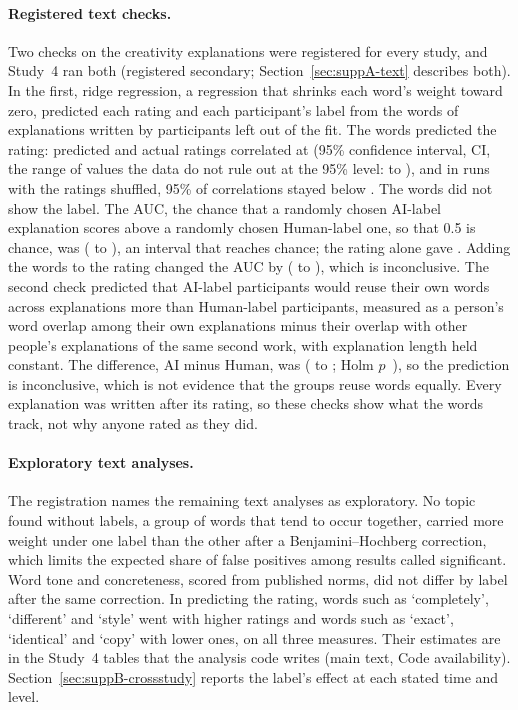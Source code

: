 \paragraph*{Registered text checks.}
Two checks on the creativity explanations were registered for every study, and Study~4 ran both (registered secondary; Section~\ref{sec:suppA-text} describes both). In the first, ridge regression, a regression that shrinks each word's weight toward zero, predicted each rating and each participant's label from the words of explanations written by participants left out of the fit. The words predicted the rating: predicted and actual ratings correlated at \SFourTextRecRatingCreat{} (95\% confidence interval, CI, the range of values the data do not rule out at the 95\% level: \SFourTextRecRatingCreatLo{} to \SFourTextRecRatingCreatHi), and in runs with the ratings shuffled, 95\% of correlations stayed below \SFourTextRecRatingCreatNull. The words did not show the label. The AUC, the chance that a randomly chosen AI-label explanation scores above a randomly chosen Human-label one, so that 0.5 is chance, was \SFourTextRecArmCreat{} (\SFourTextRecArmCreatLo{} to \SFourTextRecArmCreatHi), an interval that reaches chance; the rating alone gave \SFourTextRecArmFromRatingCreat. Adding the words to the rating changed the AUC by \SFourTextRecIncrCreat{} (\SFourTextRecIncrCreatLo{} to \SFourTextRecIncrCreatHi), which is inconclusive. The second check predicted that AI-label participants would reuse their own words across explanations more than Human-label participants, measured as a person's word overlap among their own explanations minus their overlap with other people's explanations of the same second work, with explanation length held constant. The difference, AI minus Human, was \SFourTextOverlapCreatDiff{} (\SFourTextOverlapCreatLo{} to \SFourTextOverlapCreatHi; Holm $p$~\SFourTextOverlapCreatPHolm), so the prediction is inconclusive, which is not evidence that the groups reuse words equally. Every explanation was written after its rating, so these checks show what the words track, not why anyone rated as they did.

\paragraph*{Exploratory text analyses.}
The registration names the remaining text analyses as exploratory. No topic found without labels, a group of words that tend to occur together, carried more weight under one label than the other after a Benjamini--Hochberg correction, which limits the expected share of false positives among results called significant. Word tone and concreteness, scored from published norms, did not differ by label after the same correction. In predicting the rating, words such as `completely', `different' and `style' went with higher ratings and words such as `exact', `identical' and `copy' with lower ones, on all three measures. Their estimates are in the Study~4 tables that the analysis code writes (main text, Code availability). Section~\ref{sec:suppB-crossstudy} reports the label's effect at each stated time and level.

\clearpage
